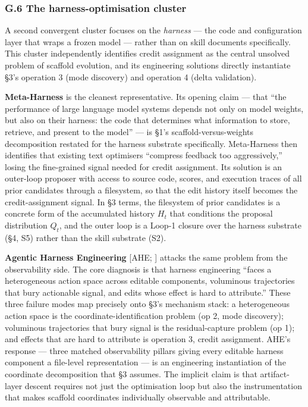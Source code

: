 \subsubsection{G.6 The harness-optimisation
cluster}\label{g.6-the-harness-optimisation-cluster}

A second convergent cluster focuses on the \emph{harness} --- the code
and configuration layer that wraps a frozen model --- rather than on
skill documents specifically. This cluster independently identifies
credit assignment as the central unsolved problem of scaffold evolution,
and its engineering solutions directly instantiate §3's operation 3
(mode discovery) and operation 4 (delta validation).

\textbf{Meta-Harness} \citep{lee2026metaharness} is the cleanest
representative. Its opening claim --- that ``the performance of large
language model systems depends not only on model weights, but also on
their harness: the code that determines what information to store,
retrieve, and present to the model'' --- is §1's scaffold-versus-weights
decomposition restated for the harness substrate specifically.
Meta-Harness then identifies that existing text optimisers ``compress
feedback too aggressively,'' losing the fine-grained signal needed for
credit assignment. Its solution is an outer-loop proposer with access to
source code, scores, and execution traces of all prior candidates
through a filesystem, so that the edit history itself becomes the
credit-assignment signal. In §3 terms, the filesystem of prior
candidates is a concrete form of the accumulated history \(H_t\) that
conditions the proposal distribution \(Q_t\), and the outer loop is a
Loop-1 closure over the harness substrate (§4, S5) rather than the skill
substrate (S2).

\textbf{Agentic Harness Engineering} {[}AHE; \citet{lin2026ahe}{]}
attacks the same problem from the observability side. The core diagnosis
is that harness engineering ``faces a heterogeneous action space across
editable components, voluminous trajectories that bury actionable
signal, and edits whose effect is hard to attribute.'' These three
failure modes map precisely onto §3's mechanism stack: a heterogeneous
action space is the coordinate-identification problem (op 2, mode
discovery); voluminous trajectories that bury signal is the
residual-capture problem (op 1); and effects that are hard to attribute
is operation 3, credit assignment. AHE's response --- three matched
observability pillars giving every editable harness component a
file-level representation --- is an engineering instantiation of the
coordinate decomposition that §3 assumes. The implicit claim is that
artifact-layer descent requires not just the optimisation loop but also
the instrumentation that makes scaffold coordinates individually
observable and attributable.

